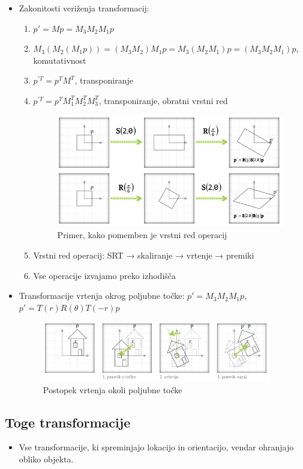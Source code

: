 \documentclass{article}
\begin{document}
\begin{itemize}
    \item Zakonitosti veriženja transformacij:
    \begin{enumerate}
        \item $p' = Mp = M_3M_2M_1p$
        \item $M_3(M_2(M_1p)) = (M_3M_2)M_1p = M_3(M_2M_1)p = (M_3M_2M_1)p$, komutativnost
        \item $p^{'T} = p^TM^T$, transponiranje
        \item $p^{'T} = p^TM_1^TM_2^TM_3^T$, transponiranje, obratni vrstni red
        \begin{figure}[H]
        \centering
        \includegraphics[width=100mm]{src/vrstni_red_veriženja.png}
        \caption{Primer, kako pomemben je vrstni red operacij}
        \end{figure} 
        \item Vrstni red operacij: SRT → skaliranje → vrtenje → premiki
        \item Vse operacije izvajamo preko izhodišča
    \end{enumerate}
    \item Transformacije vrtenja okrog poljubne točke: $p' = M_3M_2M_1p$, $p' = T(r)R(\theta)T(-r)p$
        \begin{figure}[H]
        \centering
        \includegraphics[width=100mm]{src/vrtenje_okrog_poljubne_točke.png}
        \caption{Postopek vrtenja okoli poljubne točke}
        \end{figure} 
\end{itemize}

\subsection{Toge transformacije}
\begin{itemize}
    \item Vse transformacije, ki spreminjajo lokacijo in orientacijo, vendar ohranjajo obliko objekta.
\end{itemize}
\end{document}
